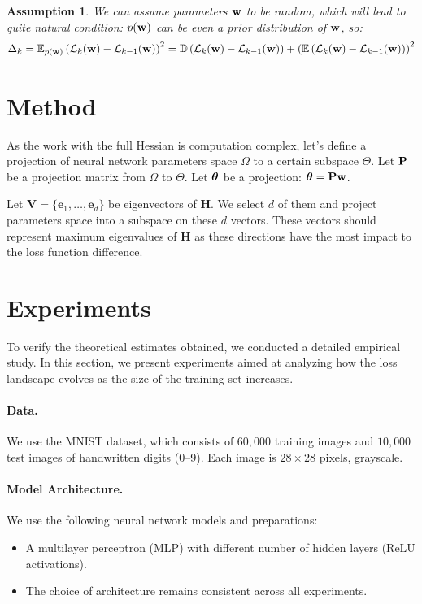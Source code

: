 \documentclass{article}
\newtheorem{assumption}{Assumption}
\begin{document}
\begin{assumption}
  We can assume parameters $\mathbf{w}$ to be random, which will lead to quite natural condition: $p(\mathbf{w})$ can be even a prior
  distribution of $\mathbf{w}$, so:
  $$\Delta_{k} = \mathbb{E}_{p(\mathbf{w})} \left( \mathcal{L}_{k}(\mathbf{w}) - \mathcal{L}_{k-1}(\mathbf{w})
    \right)^2 = \mathbb{D} \left( \mathcal{L}_{k}(\mathbf{w}) - \mathcal{L}_{k-1}(\mathbf{w}) \right) + \left( \mathbb{E} \left(
      \mathcal{L}_{k}(\mathbf{w}) - \mathcal{L}_{k-1}(\mathbf{w}) \right) \right)^2$$
\end{assumption}

\section{Method}\label{sec:method}

As the work with the full Hessian is computation complex, let's define a projection of neural network parameters space
$\Omega$ to a certain subspace $\Theta$. Let $\mathbf{P}$ be a projection matrix from $\Omega$ to $\Theta$. Let $\boldsymbol{\theta}$ be
a projection: $\boldsymbol{\theta} = \mathbf{P}\mathbf{w}$.

Let $\mathbf{V} = \{\mathbf{e}_1, \dots, \mathbf{e}_d\}$ be eigenvectors of $\mathbf{H}$. We select $d$ of them and project parameters space
into a subspace on these $d$ vectors. These vectors should represent maximum eigenvalues of $\mathbf{H}$ as these directions
have the most impact to the loss function difference.
\section{Experiments}\label{sec:exp}

To verify the theoretical estimates obtained, we conducted a detailed empirical study.
In this section, we present experiments aimed at analyzing how the loss landscape evolves as the size of the training
set increases.

\paragraph{Data.}
We use the MNIST dataset, which consists of $60{,}000$ training images and $10{,}000$ test
images of handwritten digits (0--9). Each image is $28\times28$ pixels, grayscale.

\paragraph{Model Architecture.}
We use the following neural network models and preparations:
\begin{itemize}
  \item A multilayer perceptron (MLP) with different number of hidden layers (ReLU activations).
  \item The choice of architecture remains consistent across all experiments.
\end{itemize}
\end{document}
